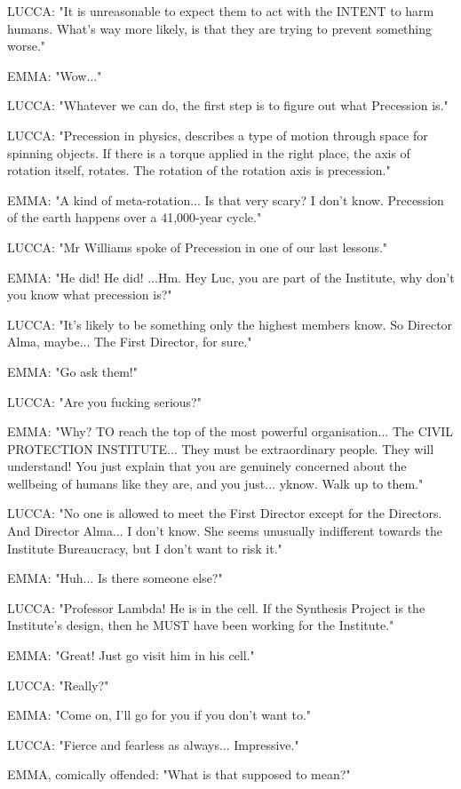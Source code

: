 \documentclass[11pt]{article}
\begin{document}
LUCCA: "It is unreasonable to expect them to act with the INTENT to harm humans. 
What's way more likely, is that they are trying to prevent something worse."

EMMA: "Wow..."

LUCCA: "Whatever we can do, the first step is to figure out what Precession is."

LUCCA: "Precession in physics, describes a type of motion through space for spinning objects.
If there is a torque applied in the right place, the axis of rotation itself, rotates.
The rotation of the rotation axis is precession."

EMMA: "A kind of meta-rotation...
Is that very scary? I don't know.
Precession of the earth happens over a 41,000-year cycle."

LUCCA: "Mr Williams spoke of Precession in one of our last lessons."

EMMA: "He did! He did!
...Hm. Hey Luc, you are part of the Institute, why don't you know what precession is?"

LUCCA: "It's likely to be something only the highest members know.
So Director Alma, maybe...
The First Director, for sure."

EMMA: "Go ask them!"

LUCCA: "Are you fucking serious?"

EMMA: "Why? 
TO reach the top of the most powerful organisation... The CIVIL PROTECTION INSTITUTE... They must be extraordinary people.
They will understand!
You just explain that you are genuinely concerned about the wellbeing of humans like they are, and you just... yknow. 
Walk up to them."

LUCCA: "No one is allowed to meet the First Director except for the Directors. 
And Director Alma...
I don't know. 
She seems unusually indifferent towards the Institute Bureaucracy, but I don't want to risk it."

EMMA: "Huh... Is there someone else?"

LUCCA: "Professor Lambda! He is in the cell. 
If the Synthesis Project is the Institute's design, then he MUST have been working for the Institute."

EMMA: "Great! Just go visit him in his cell."

LUCCA: "Really?"

EMMA: "Come on, I'll go for you if you don't want to."

LUCCA: "Fierce and fearless as always... Impressive."

EMMA, comically offended: "What is that supposed to mean?"
\end{document}
